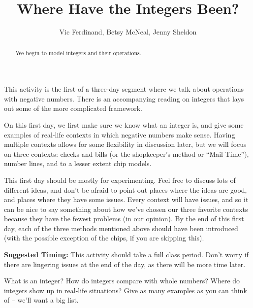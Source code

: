 \documentclass{ximera}
\title{Where Have the Integers Been?}
\author{Vic Ferdinand, Betsy McNeal, Jenny Sheldon}
\begin{document}
\begin{abstract}
    We begin to model integers and their operations.
\end{abstract}
\maketitle

\begin{instructorIntro}
This activity is the first of a three-day segment where we talk about operations with negative numbers.  There is an accompanying reading on integers that lays out some of the more complicated framework.

On this first day, we first make sure we know what an integer is, and give some examples of real-life contexts in which negative numbers make sense.  Having multiple contexts allows for some flexibility in discussion later, but we will focus on three contexts: checks and bills (or the shopkeeper's method or ``Mail Time''), number lines, and to a lesser extent chip models.

This first day should be mostly for experimenting.  Feel free to discuss lots of different ideas, and don't be afraid to point out places where the ideas are good, and places where they have some issues.  Every context will have issues, and so it can be nice to say something about how we've chosen our three favorite contexts because they have the fewest problems (in our opinion).  By the end of this first day, each of the three methods mentioned above should have been introduced (with the possible exception of the chips, if you are skipping this).

{\bf Suggested Timing:} This activity should take a full class period.  Don't worry if there are lingering issues at the end of the day, as there will be more time later.
\end{instructorIntro}

\begin{question}
What is an integer?  How do integers compare with whole numbers?  Where do integers show up in real-life situations?  Give as many examples as you can think of -- we'll want a big list.

\end{question}
\end{document}
